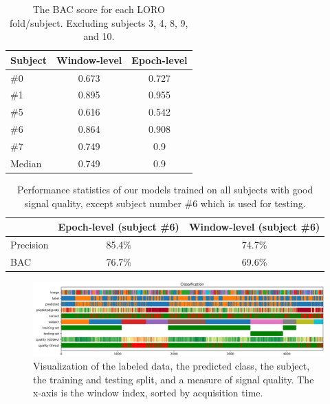         \begin{table}[h]
            \centering
            \begin{tabular}{lcc}
            \toprule
                \textbf{Subject} & \textbf{Window-level} & \textbf{Epoch-level} \\
            \midrule
            \#0 & 0.673 & 0.727 \\
            \#1 & 0.895 & 0.955 \\
            \#5 & 0.616 & 0.542 \\
            \#6 & 0.864 & 0.908 \\
            \#7 & 0.749 & 0.9   \\
            \midrule
            Median & 0.749 & 0.9 \\
            \bottomrule
            \end{tabular}
            \caption{The BAC score for each LORO fold/subject. Excluding subjects 3, 4, 8, 9, and 10.}
        \end{table}

        \begin{table}
            \begin{center}
                \begin{tabular}{lcc}
                  \toprule
                            & Epoch-level (subject \#6) & Window-level (subject \#6) \\
                  \midrule
                  Precision & 85.4\%                    & 74.7\% \\
                  BAC       & 76.7\%                    & 69.6\% \\
                  \bottomrule
                \end{tabular}
                \caption{Performance statistics of our models trained on all subjects with good signal quality, except subject number \#6 which is used for testing.}\label{fig:stats}
            \end{center}
        \end{table}

        \begin{figure}
        \centering
        \includegraphics[width=24cm]{img/timebars.png}
        \caption{Visualization of the labeled data, the predicted class, the subject, the training and testing split, and a measure of signal quality. The x-axis is the window index, sorted by acquisition time.}\label{fig:timebars}
        \end{figure}

